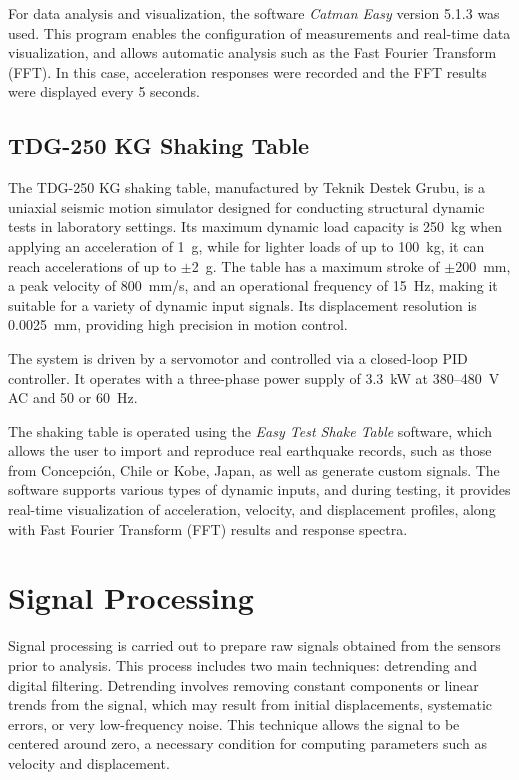 \documentclass{article}  %
\begin{document}
For data analysis and visualization, the software \textit{Catman Easy} version 5.1.3 was used. This program enables the configuration of measurements and real-time data visualization, and allows automatic analysis such as the Fast Fourier Transform (FFT). In this case, acceleration responses were recorded and the FFT results were displayed every 5 seconds.


\subsection{TDG-250 KG Shaking Table}

The TDG-250 KG shaking table, manufactured by Teknik Destek Grubu, is a uniaxial seismic motion simulator designed for conducting structural dynamic tests in laboratory settings. Its maximum dynamic load capacity is 250~kg when applying an acceleration of 1~g, while for lighter loads of up to 100~kg, it can reach accelerations of up to $\pm$2~g. The table has a maximum stroke of $\pm$200~mm, a peak velocity of 800~mm/s, and an operational frequency of 15~Hz, making it suitable for a variety of dynamic input signals. Its displacement resolution is 0.0025~mm, providing high precision in motion control.

The system is driven by a servomotor and controlled via a closed-loop PID controller. It operates with a three-phase power supply of 3.3~kW at 380--480~V AC and 50 or 60~Hz.

The shaking table is operated using the \textit{Easy Test Shake Table} software, which allows the user to import and reproduce real earthquake records, such as those from Concepción, Chile or Kobe, Japan, as well as generate custom signals. The software supports various types of dynamic inputs, and during testing, it provides real-time visualization of acceleration, velocity, and displacement profiles, along with Fast Fourier Transform (FFT) results and response spectra.

\newpage
\section{Signal Processing}

Signal processing is carried out to prepare raw signals obtained from the sensors prior to analysis. This process includes two main techniques: detrending and digital filtering. Detrending involves removing constant components or linear trends from the signal, which may result from initial displacements, systematic errors, or very low-frequency noise. This technique allows the signal to be centered around zero, a necessary condition for computing parameters such as velocity and displacement.
\end{document}
